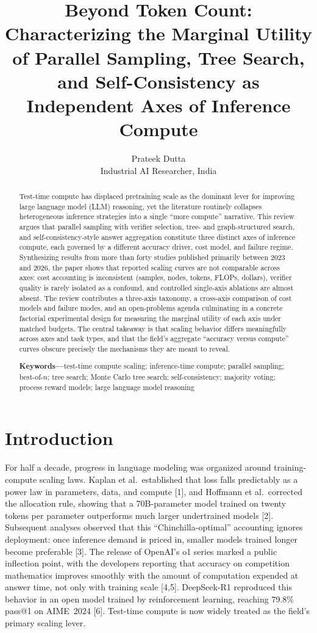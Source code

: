 \documentclass[10pt]{article}
\title{\bfseries Beyond Token Count: Characterizing the Marginal Utility of Parallel Sampling, Tree Search, and Self-Consistency as Independent Axes of Inference Compute}
\author{Prateek Dutta\\ \small Industrial AI Researcher, India}
\date{}
\begin{document}
\maketitle

\begin{abstract}
\noindent Test-time compute has displaced pretraining scale as the dominant lever for improving large language model (LLM) reasoning, yet the literature routinely collapses heterogeneous inference strategies into a single ``more compute'' narrative. This review argues that parallel sampling with verifier selection, tree- and graph-structured search, and self-consistency-style answer aggregation constitute three distinct axes of inference compute, each governed by a different accuracy driver, cost model, and failure regime. Synthesizing results from more than forty studies published primarily between 2023 and 2026, the paper shows that reported scaling curves are not comparable across axes: cost accounting is inconsistent (samples, nodes, tokens, FLOPs, dollars), verifier quality is rarely isolated as a confound, and controlled single-axis ablations are almost absent. The review contributes a three-axis taxonomy, a cross-axis comparison of cost models and failure modes, and an open-problems agenda culminating in a concrete factorial experimental design for measuring the marginal utility of each axis under matched budgets. The central takeaway is that scaling behavior differs meaningfully across axes and task types, and that the field's aggregate ``accuracy versus compute'' curves obscure precisely the mechanisms they are meant to reveal.

\medskip
\noindent\textbf{Keywords---}test-time compute scaling; inference-time compute; parallel sampling; best-of-$n$; tree search; Monte Carlo tree search; self-consistency; majority voting; process reward models; large language model reasoning
\end{abstract}

\section{Introduction}
\label{sec:intro}

For half a decade, progress in language modeling was organized around training-compute scaling laws. Kaplan et al.\ established that loss falls predictably as a power law in parameters, data, and compute [1], and Hoffmann et al.\ corrected the allocation rule, showing that a 70B-parameter model trained on twenty tokens per parameter outperforms much larger undertrained models [2]. Subsequent analyses observed that this ``Chinchilla-optimal'' accounting ignores deployment: once inference demand is priced in, smaller models trained longer become preferable [3]. The release of OpenAI's o1 series marked a public inflection point, with the developers reporting that accuracy on competition mathematics improves smoothly with the amount of computation expended at answer time, not only with training scale [4,5]. DeepSeek-R1 reproduced this behavior in an open model trained by reinforcement learning, reaching 79.8\% pass@1 on AIME~2024 [6]. Test-time compute is now widely treated as the field's primary scaling lever.
\end{document}
